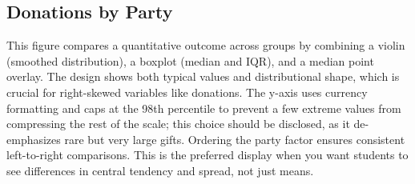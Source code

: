 \documentclass[
  letterpaper,
  DIV=11,
  numbers=noendperiod]{scrreprt}
\begin{document}
\subsection{Donations by Party}\label{donations-by-party}

This figure compares a quantitative outcome across groups by combining a
violin (smoothed distribution), a boxplot (median and IQR), and a median
point overlay. The design shows both typical values and distributional
shape, which is crucial for right-skewed variables like donations. The
y-axis uses currency formatting and caps at the 98th percentile to
prevent a few extreme values from compressing the rest of the scale;
this choice should be disclosed, as it de-emphasizes rare but very large
gifts. Ordering the party factor ensures consistent left-to-right
comparisons. This is the preferred display when you want students to see
differences in central tendency and spread, not just means.
\end{document}
